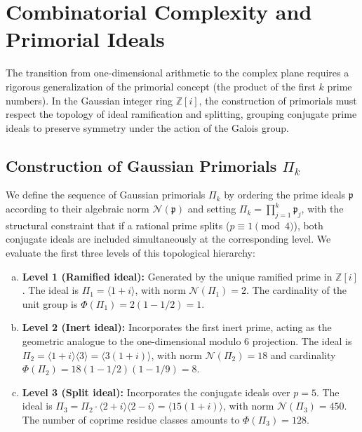 \documentclass{article}
\numberwithin{equation}{section}
\theoremstyle{plain}
\theoremstyle{definition}
\begin{document}
\section{Combinatorial Complexity and Primorial Ideals}
\label{sec:entropia}

The transition from one-dimensional arithmetic to the complex plane requires a rigorous generalization of the primorial concept (the product of the first $k$ prime numbers). In the Gaussian integer ring $\mathbb{Z}[i]$, the construction of primorials must respect the topology of ideal ramification and splitting, grouping conjugate prime ideals to preserve symmetry under the action of the Galois group.

\subsection{Construction of Gaussian Primorials \texorpdfstring{$\Pi_k$}{Pi\_k}}

We define the sequence of Gaussian primorials $\Pi_k$ by ordering the prime ideals $\mathfrak{p}$ according to their algebraic norm $\mathcal{N}(\mathfrak{p})$ and setting $\Pi_k = \prod_{j=1}^k \mathfrak{p}_j$, with the structural constraint that if a rational prime splits ($p \equiv 1 \pmod 4$), both conjugate ideals are included simultaneously at the corresponding level. We evaluate the first three levels of this topological hierarchy:

\begin{enumerate}[(a)]
    \item \textbf{Level 1 (Ramified ideal):} Generated by the unique ramified prime in $\mathbb{Z}[i]$. The ideal is $\Pi_1 = \langle 1+i \rangle$, with norm $\mathcal{N}(\Pi_1) = 2$. The cardinality of the unit group is $\Phi(\Pi_1) = 2 (1 - 1/2) = 1$.
    \item \textbf{Level 2 (Inert ideal):} Incorporates the first inert prime, acting as the geometric analogue to the one-dimensional modulo $6$ projection. The ideal is $\Pi_2 = \langle 1+i \rangle \langle 3 \rangle = \langle 3(1+i) \rangle$, with norm $\mathcal{N}(\Pi_2) = 18$ and cardinality $\Phi(\Pi_2) = 18 (1 - 1/2)(1 - 1/9) = 8$.
    \item \textbf{Level 3 (Split ideal):} Incorporates the conjugate ideals over $p=5$. The ideal is $\Pi_3 = \Pi_2 \cdot \langle 2+i \rangle \langle 2-i \rangle = \langle 15(1+i) \rangle$, with norm $\mathcal{N}(\Pi_3) = 450$. The number of coprime residue classes amounts to $\Phi(\Pi_3) = 128$.
\end{enumerate}
\end{document}
